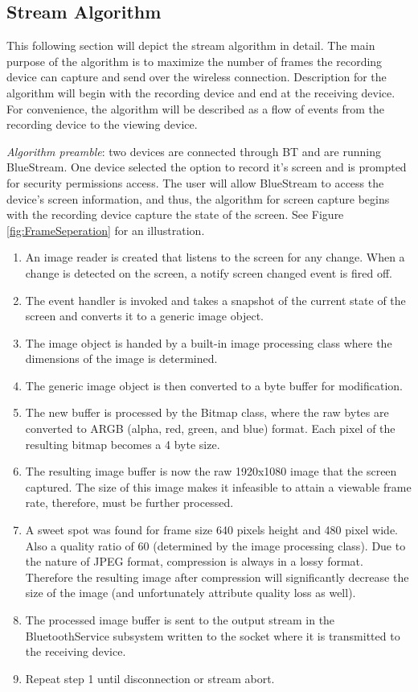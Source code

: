 \documentclass[a4paper,12pt]{article}
\begin{document}
\subsection{Stream Algorithm}
This following section will depict the stream algorithm in detail. The main purpose of the algorithm is to maximize the number of frames the recording device can capture and send over the wireless connection. Description for the algorithm will begin with the recording device and end at the receiving device. For convenience, the algorithm will be described as a flow of events from the recording device to the viewing device. 

\textit{Algorithm preamble}: two devices are connected through BT and are running BlueStream. One device selected the option to record it’s screen and is prompted for security permissions access. The user will allow BlueStream to access the device’s screen information, and thus, the algorithm for screen capture begins with the recording device capture the state of the screen. See Figure \ref{fig:FrameSeperation} for an illustration.

\begin{enumerate}
\item An image reader is created that listens to the screen for any change. When a change is detected on the screen, a notify screen changed event is fired off.
\item The event handler is invoked and takes a snapshot of the current state of the screen and converts it to a generic image object. 
\item The image object is handed by a built-in image processing class where the dimensions of the image is determined.
\item The generic image object is then converted to a byte buffer for modification.
\item The new buffer is processed by the Bitmap class, where the raw bytes are converted to ARGB (alpha, red, green, and blue) format. Each pixel of the resulting bitmap becomes a 4 byte size. 
\item The resulting image buffer is now the raw 1920x1080 image that the screen captured. The size of this image makes it infeasible to attain a viewable frame rate, therefore, must be further processed. 
\item A sweet spot was found for frame size 640 pixels height and 480 pixel wide. Also a quality ratio of 60 (determined by the image processing class). Due to the nature of JPEG format, compression is always in a lossy format. Therefore the resulting image after compression will significantly decrease the size of the image (and unfortunately attribute quality loss as well).
\item The processed image buffer is sent to the output stream in the BluetoothService subsystem written to the socket where it is transmitted to the receiving device.
\item Repeat step 1 until disconnection or stream abort. 
\end{enumerate}
\end{document}
